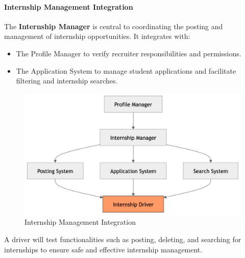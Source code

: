 \paragraph{Internship Management Integration}
The \textbf{Internship Manager} is central to coordinating the posting and management of internship opportunities. It integrates with:
\begin{itemize}
    \item The Profile Manager to verify recruiter responsibilities and permissions.
    \item The Application System to manage student applications and facilitate filtering and internship searches.
\end{itemize}
\begin{figure}[H]
    \begin{center}
        \includegraphics[width=0.79\linewidth]{JhaBhatiaSharma/imagesDD/InternshipManagementIntegration.png}
        \caption{Internship Management Integration}
        \label{fig:internshipManagement}
    \end{center}
\end{figure}
A driver will test functionalities such as posting, deleting, and searching for internships to ensure safe and effective internship management.

